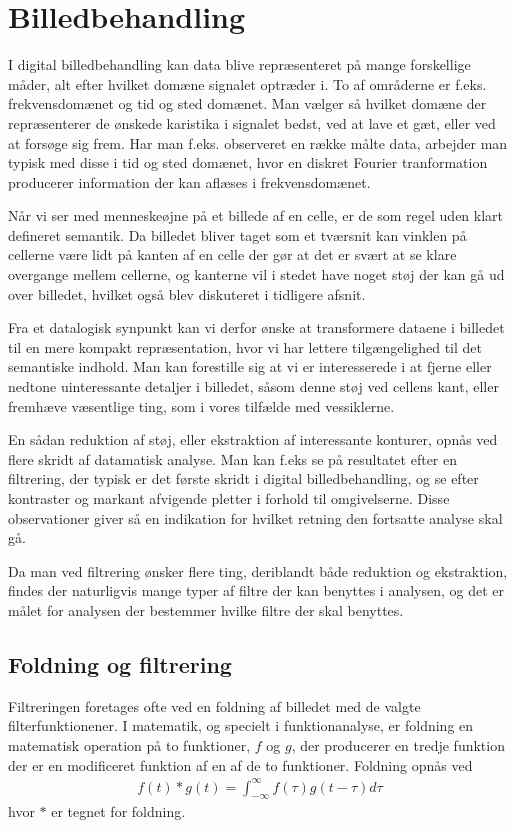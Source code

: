 \section{Billedbehandling}
I digital billedbehandling kan data blive repræsenteret på mange forskellige måder, alt efter hvilket domæne signalet optræder i. To af områderne er f.eks. frekvensdomænet og tid og sted domænet. Man vælger så hvilket domæne der repræsenterer de ønskede karistika i signalet bedst, ved at lave et gæt, eller ved at forsøge sig frem. Har man f.eks. observeret en række målte data, arbejder man typisk med disse i tid og sted domænet, hvor en diskret Fourier tranformation producerer information der kan aflæses i frekvensdomænet. 

Når vi ser med menneskeøjne på et billede af en celle, er de som regel uden klart defineret semantik. Da billedet bliver taget som et tværsnit kan vinklen på cellerne være lidt på kanten af en celle der gør at det er svært at se klare overgange mellem cellerne, og kanterne vil i stedet have noget støj der kan gå ud over billedet, hvilket også blev diskuteret i tidligere afsnit.

Fra et datalogisk synpunkt kan vi derfor ønske at transformere dataene i billedet til en mere kompakt repræsentation, hvor vi har lettere tilgængelighed til det semantiske indhold. Man kan forestille sig at vi er interesserede i at fjerne eller nedtone uinteressante detaljer i billedet, såsom denne støj ved cellens kant, eller fremhæve væsentlige ting, som i vores tilfælde med vessiklerne. 

En sådan reduktion af støj, eller ekstraktion af interessante konturer, opnås ved flere skridt af datamatisk analyse. Man kan f.eks se på resultatet efter en filtrering, der typisk er det første skridt i digital billedbehandling, og se efter kontraster og markant afvigende pletter i forhold til omgivelserne. Disse observationer giver så en indikation for hvilket retning den fortsatte analyse skal gå.

Da man ved filtrering ønsker flere ting, deriblandt både reduktion og ekstraktion, findes der naturligvis mange typer af filtre der kan benyttes i analysen, og det er målet for analysen der bestemmer hvilke filtre der skal benyttes. 

\subsection{Foldning og filtrering}
Filtreringen foretages ofte ved en foldning af billedet med de valgte filterfunktionener. I matematik, og specielt i funktionanalyse, er foldning en matematisk operation på to funktioner, $f$ og $g$, der producerer en tredje funktion der er en modificeret funktion af en af de to funktioner. Foldning opnås ved
\begin{align}
	f(t)*g(t)=\int_{-\infty}^{\infty}f(\tau)g(t-\tau)d\tau
\end{align}
hvor $*$ er tegnet for foldning. 

